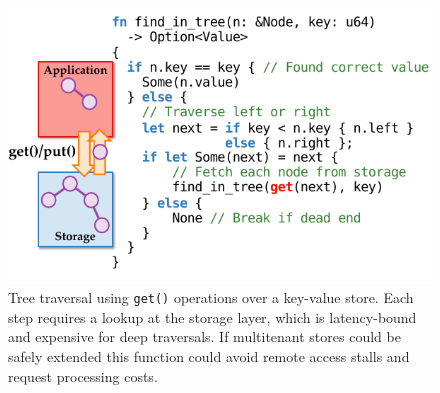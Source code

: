 \begin{figure}[t]
\centering
\includegraphics[width=1.0\columnwidth]{figures/sandstorm-tree-traversal.pdf}
\caption{Tree traversal using \texttt{get()} operations over a key-value
	store. Each step requires a lookup at the
	storage layer, which is latency-bound and expensive for deep traversals.
  If multitenant stores could be safely extended this function could avoid
  remote access stalls and request processing costs.}
\label{fig:kv-tree-traversal}
\end{figure}
